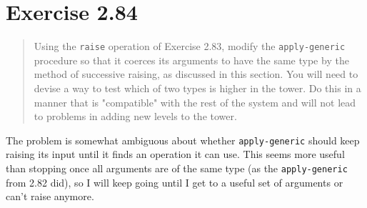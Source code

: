 \documentclass{article}
\begin{document}


\section{Exercise 2.84}
\begin{quote}
    Using the \texttt{raise} operation of Exercise 2.83, modify the
    \texttt{apply-generic} procedure so that it coerces its arguments to have
    the same type by the method of successive raising, as discussed in this
    section. You will need to devise a way to test which of two types is higher
    in the tower. Do this in a manner that is "compatible" with the rest of the
    system and will not lead to problems in adding new levels to the tower.
\end{quote}

The problem is somewhat ambiguous about whether \texttt{apply-generic} should
keep raising its input until it finds an operation it can use. This seems more
useful than stopping once all arguments are of the same type (as the
\texttt{apply-generic} from 2.82 did), so I will keep going until I get to a
useful set of arguments or can't raise anymore.


\end{document}
